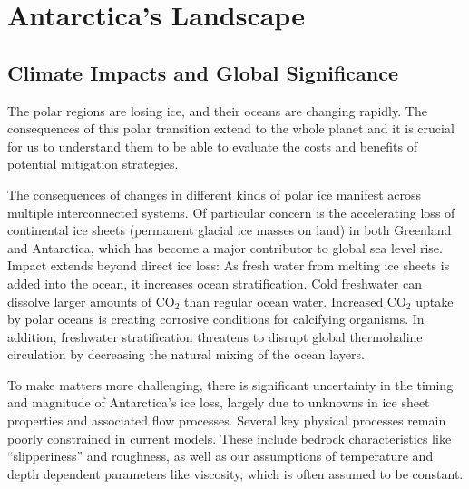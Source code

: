 \chapter{Antarctica's Landscape}\label{why}
\section*{Climate Impacts and Global Significance}

The polar regions are losing ice, and their oceans are changing rapidly\cite{O_C_in_changingClimate}. The consequences of this polar transition extend to the whole planet and it is crucial for us to understand them to be able to evaluate the costs and benefits of potential mitigation strategies. 

The consequences of changes in different kinds of polar ice manifest across multiple interconnected systems. Of particular concern is the accelerating loss of continental ice sheets (permanent glacial ice masses on land) in both Greenland and Antarctica, which has become a major contributor to global sea level rise\cite{O_C_in_changingClimate}. Impact extends beyond direct ice loss: As fresh water from melting ice sheets is added into the ocean, it increases ocean stratification. Cold freshwater can dissolve larger amounts of $\mathrm{CO_2}$ than regular ocean water. Increased $\mathrm{CO_2}$ uptake by polar oceans is creating corrosive conditions for calcifying organisms\cite{O_C_in_changingClimate}. In addition, freshwater stratification threatens to disrupt global thermohaline circulation\cite{Jacobs_2004} by decreasing the natural mixing of the ocean layers.
 
To make matters more challenging, there is significant uncertainty in the timing and magnitude of Antarctica's ice loss, largely due to unknowns in ice sheet properties and associated flow processes\cite{IPCC}. Several key physical processes remain poorly constrained in current models. These include bedrock characteristics like ``slipperiness'' and roughness, as well as our assumptions of temperature and depth dependent parameters like viscosity, which is often assumed to be constant.




